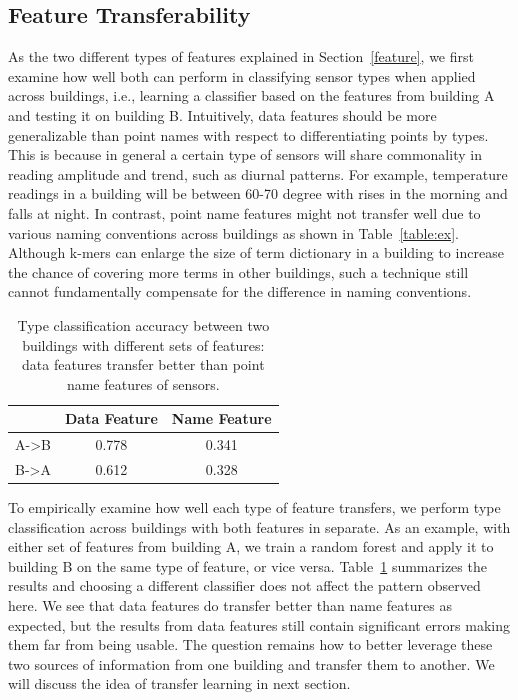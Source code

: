 \subsection{Feature Transferability}
As the two different types of features explained in Section~\ref{feature}, we first examine how well both can perform in classifying sensor types when applied across buildings, i.e., learning a classifier based on the features from building A and testing it on building B. 
Intuitively, data features should be more generalizable than point names with respect to differentiating points by types. 
This is because in general a certain type of sensors will share commonality in reading amplitude and trend, such as diurnal patterns. 
For example, temperature readings in a building will be between 60-70 degree with rises in the morning and falls at night.
In contrast, point name features might not transfer well due to various naming conventions across buildings as shown in Table~\ref{table:ex}.
Although k-mers can enlarge the size of term dictionary in a building to increase the chance of covering more terms in other buildings, such a technique still cannot fundamentally compensate for the difference in naming conventions.


\begin{table}[h]
\centering
\begin{tabular}{l|c|c}
\hline
                & Data Feature & Name Feature \\ \hline
A-\textgreater B & 0.778       & 0.341       \\
B-\textgreater A & 0.612       & 0.328       \\ \hline
\end{tabular}
\caption{Type classification accuracy between two buildings with different sets of features: data features transfer better than point name features of sensors.}
\label{table:clf}
\end{table}


To empirically examine how well each type of feature transfers, we perform type classification across buildings with both features in separate. 
As an example, with either set of features from building A, we train a random forest and apply it to building B on the same type of feature, or vice versa. 
Table~\ref{table:clf} summarizes the results and choosing a different classifier does not affect the pattern observed here.
We see that data features do transfer better than name features as expected, but the results from data features still contain significant errors making them far from being usable. 
The question remains how to better leverage these two sources of information from one building and transfer them to another.
We will discuss the idea of transfer learning in next section.


